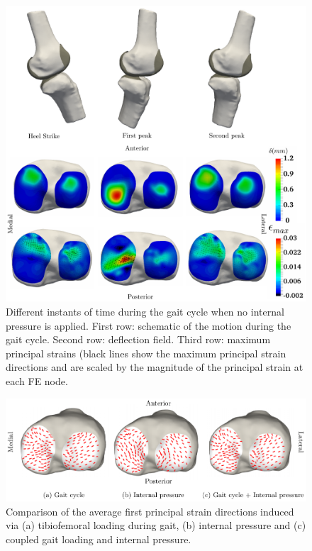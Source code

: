 \begin{figure}[H]
	\begin{center}
		\includegraphics[width=\columnwidth]{images/AC/Tibia_Gait.png}
		\caption{Different instants of time during the gait cycle when no internal pressure is applied. First row: schematic of the motion during the gait cycle. Second row: deflection field. Third row: maximum principal strains (black lines show the maximum principal strain directions and are scaled by the magnitude of the principal strain at each FE node.}\label{fig:Tibia_Gait}
	\end{center}
\end{figure}

\begin{figure}[H]
	\begin{center}
		\includegraphics[width=\columnwidth]{images/AC/Tibia-Revised.pdf}
		\caption{Comparison of the average first principal strain directions induced via (a) tibiofemoral loading during gait, (b) internal pressure and (c) coupled gait loading and  internal pressure.}\label{fig:Tibia}
	\end{center}
\end{figure}

